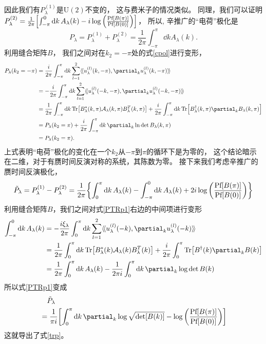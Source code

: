 因此我们有$P_\lambda ^{(1)}$是$\mathrm{U}(2)$不变的，
这与费米子的情况类似\cite{Fu2006}。
同理，我们可以证明$P_\lambda ^{(2)}=\frac{1}{2\pi}\bqty{\int_{-\pi}^0 \dd{k}A_\lambda (k)-i\log\pqty{\frac{\pf[B(\pi)]}{\pf[B(0)]}}}$，
所以, 
辛推广的“电荷”极化是
\begin{equation}\label{cpol}
	P_\lambda =P^{(1)}_\lambda +P^{(2)}_\lambda =\frac{1}{2\pi}\int_{-\pi}^\pi\dd{k} A_\lambda (k).
\end{equation}
利用缝合矩阵$B$，
我们之间对在$k_2=-\pi$处的式\eqref{cpol}进行变形，
\begin{equation}
\begin{split}
		P_\lambda (k_2=-\pi) &=\frac{i}{2\pi}\int_{-\pi}^\pi\dd{k}\sum_{l=1}^2\krin{u^{(l)}_\lambda (k,-\pi),\partial_{k}u^{(l)}_\lambda (k,-\pi)}\\
	& =-\frac{i}{2\pi}\int_{-\pi}^\pi\dd{k}\sum_{l=1}^2\krin{u^{(l)}_\lambda (-k,-\pi),\partial_{k}u_\lambda ^{(l)}(-k,-\pi)}\\
	&=\frac{1}{2\pi}\int_{-\pi}^\pi\dd{k}\Tr[B^*_\lambda (k,\pi)\mathcal A_\lambda (k,\pi) B_\lambda^T(k,\pi)]+\frac{i}{2\pi}\int_{-\pi}^\pi\dd{k}\Tr[B_\lambda ^\dagger(k,\pi)\partial_k B_\lambda (k,\pi)] \\
	&=P_\lambda (k_2=\pi)+\frac{i}{2\pi}\int_{-\pi}^\pi\dd{k}\partial_k\ln \det B_\lambda (k,\pi)\\
	&=P_\lambda (k_2=\pi).
\end{split}
\end{equation}
上式表明“电荷”极化的变化在一个$k_2$从$-\pi$到$\pi$的循环下是为零的，
这个结论暗示在二维，对于有赝时间反演对称的系统，其陈数为零。
接下来我们考虑辛推广的赝时间反演极化，
\begin{equation}
	\tilde P_\lambda  =P^{(1)}_\lambda -P^{(2)}_\lambda = \frac{1}{2\pi}\Bqty{\int_0^\pi \dd{k}A_\lambda (k)-\int^0_{-\pi} \dd{k}A_\lambda (k)+2i\log\pqty{\frac{\pf[B(\pi)]}{\pf[B(0)]}}}\label{PTRp1}
\end{equation}
利用缝合矩阵$B$，我们之间对式\eqref{PTRp1}右边的中间项进行变形
\begin{equation}
\begin{split}
	\int^0_{-\pi} \dd{k}A_\lambda (k) &=-\frac{i\xi_\lambda }{2\pi}\int_0^\pi \dd{k}\sum_{l=1}^2\krin{u_\lambda ^{(l)}(-k),\partial_k u^{(l)}_\lambda (-k)}\\
	&=\frac{1}{2\pi}\int_0^\pi\dd{k} \Tr[B^*_\lambda (k)\mathcal A_\lambda (k) B^T_\lambda (k)]+\frac{i}{2\pi}\int_0^\pi\Tr[B^\dagger(k)\partial_k B(k)]\\
	&= \frac{1}{2\pi}\int_0^\pi\dd{k}A_\lambda (k)-\frac{1}{2\pi i}\int_0^\pi\dd{k}\partial_k\log\det B(k)
\end{split}
\end{equation}
所以式\eqref{PTRp1}变成
\begin{equation}
\begin{split}
	&\quad \tilde P_\lambda \\
	& =\frac{1}{\pi i}\bqty{\int_0^\pi\dd{k} \partial_k \log\sqrt{\det[B(k)]}-\log\pqty{\frac{\pf[B(\pi)]}{\pf[B(0)]}}}
\end{split}
\end{equation}
这就导出了式\eqref{trp}。

